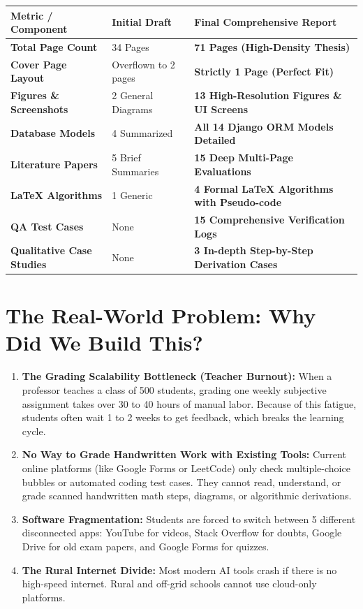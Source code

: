 \documentclass[11pt,a4paper]{article}
\begin{document}
\begin{center}
\small
\begin{tabularx}{\textwidth}{p{4.2cm} p{3.8cm} X}
\toprule
\textbf{Metric / Component} & \textbf{Initial Draft} & \textbf{Final Comprehensive Report} \\
\midrule
\textbf{Total Page Count} & 34 Pages & \textbf{71 Pages (High-Density Thesis)} \\
\textbf{Cover Page Layout} & Overflown to 2 pages & \textbf{Strictly 1 Page (Perfect Fit)} \\
\textbf{Figures \& Screenshots} & 2 General Diagrams & \textbf{13 High-Resolution Figures \& UI Screens} \\
\textbf{Database Models} & 4 Summarized & \textbf{All 14 Django ORM Models Detailed} \\
\textbf{Literature Papers} & 5 Brief Summaries & \textbf{15 Deep Multi-Page Evaluations} \\
\textbf{LaTeX Algorithms} & 1 Generic & \textbf{4 Formal LaTeX Algorithms with Pseudo-code} \\
\textbf{QA Test Cases} & None & \textbf{15 Comprehensive Verification Logs} \\
\textbf{Qualitative Case Studies} & None & \textbf{3 In-depth Step-by-Step Derivation Cases} \\
\bottomrule
\end{tabularx}
\end{center}

\section{The Real-World Problem: Why Did We Build This?}
\begin{enumerate}[leftmargin=*]
    \item \textbf{The Grading Scalability Bottleneck (Teacher Burnout):} When a professor teaches a class of 500 students, grading one weekly subjective assignment takes over 30 to 40 hours of manual labor. Because of this fatigue, students often wait 1 to 2 weeks to get feedback, which breaks the learning cycle.
    \item \textbf{No Way to Grade Handwritten Work with Existing Tools:} Current online platforms (like Google Forms or LeetCode) only check multiple-choice bubbles or automated coding test cases. They cannot read, understand, or grade scanned handwritten math steps, diagrams, or algorithmic derivations.
    \item \textbf{Software Fragmentation:} Students are forced to switch between 5 different disconnected apps: YouTube for videos, Stack Overflow for doubts, Google Drive for old exam papers, and Google Forms for quizzes.
    \item \textbf{The Rural Internet Divide:} Most modern AI tools crash if there is no high-speed internet. Rural and off-grid schools cannot use cloud-only platforms.
\end{enumerate}
\end{document}
